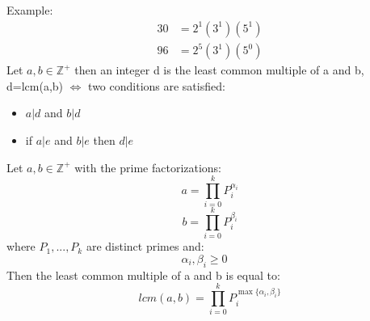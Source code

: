 \documentclass[12pt]{article}
\newcommand{\Z}{\mathbb{Z}}
\theoremstyle{definition}
\theoremstyle{remark}
\numberwithin{equation}{section}
\begin{document}
Example:
\begin{align*}
  30&=2^1(3^1)(5^1)\\
  96&=2^5(3^1)(5^0)
\end{align*}
 Let $a,b \in \Z^+$ then an integer d is the least common multiple of a and b, d=lcm(a,b) $\iff$ two conditions are satisfied:
\begin{itemize}
  \item $a|d$ and $b|d$
  \item if $a|e$ and $b|e$ then $d|e$
\end{itemize}
\prop Let $a,b \in \Z^+$ with the prime factorizations:
\[
  a=\prod_{i=0}^kP_i^{\alpha_i}
\]
\[
  b=\prod_{i=0}^kP_i^{\beta_i}
\]
where $P_1,...,P_k$ are distinct primes and:
\[
  \alpha_i,\beta_i \geq 0\quad
\]
Then the least common multiple of a and b is equal to:
\[
  lcm(a,b)=\prod_{i=0}^kP_i^{\max\{\alpha_i,\beta_i\}}
\]
\end{document}
